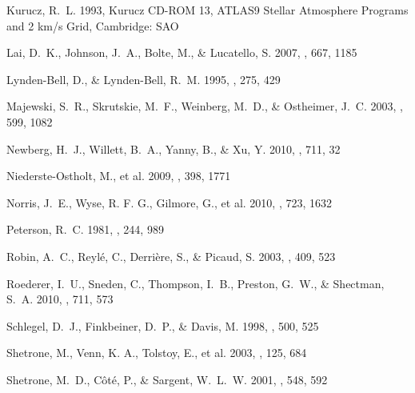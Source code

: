 \documentclass{emulateapj}
\begin{document}
\begin{thebibliography}{40}
{Kurucz}, R.~L. 1993, {Kurucz CD-ROM 13, ATLAS9 Stellar Atmosphere Programs and
  2 km/s Grid}, Cambridge: SAO

{Lai}, D.~K., {Johnson}, J.~A., {Bolte}, M., \& {Lucatello}, S. 2007, \apj,
  667, 1185

{Lynden-Bell}, D., \& {Lynden-Bell}, R.~M. 1995, \mnras, 275, 429

{Majewski}, S.~R., {Skrutskie}, M.~F., {Weinberg}, M.~D., \& {Ostheimer}, J.~C.
  2003, \apj, 599, 1082

{Newberg}, H.~J., {Willett}, B.~A., {Yanny}, B., \& {Xu}, Y. 2010, \apj, 711,
  32

{Niederste-Ostholt}, M., {et al.}   2009, \mnras, 398, 1771

{Norris}, J.~E., {Wyse}, R. F. G., {Gilmore}, G., {et al.} 2010, \apj, 723, 1632

{Peterson}, R.~C. 1981, \apj, 244, 989

{Robin}, A.~C., {Reyl{\'e}}, C., {Derri{\`e}re}, S., \& {Picaud}, S. 2003, \aap, 409, 523 

{Roederer}, I.~U., {Sneden}, C., {Thompson}, I.~B., {Preston}, G.~W., \&
  {Shectman}, S.~A. 2010, \apj, 711, 573

{Schlegel}, D.~J., {Finkbeiner}, D.~P., \& {Davis}, M. 1998, \apj, 500, 525

{Shetrone}, M., {Venn}, K. A., {Tolstoy}, E., {et al.} 2003, \aj, 125, 684

{Shetrone}, M.~D., {C{\^o}t{\'e}}, P., \& {Sargent}, W.~L.~W. 2001, \apj, 548,
  592


\end{thebibliography}
\end{document}
